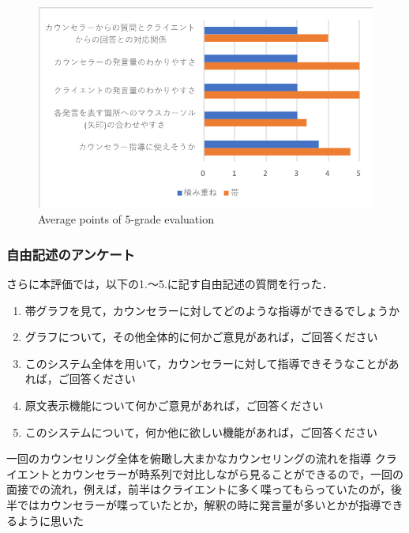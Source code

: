 \documentclass[shuuron]{kuee}
\begin{document}
\begin{figure}
  \begin{center}
    \includegraphics[width=\linewidth]{keijouAnketo.png}
  \end{center}
  \caption{Average points of 5-grade evaluation}
  \label{fig:keijouAnketo}
\end{figure}


\subsubsection{自由記述のアンケート}

さらに本評価では，以下の1.〜5.に記す自由記述の質問を行った．

\begin{enumerate}
  \item 帯グラフを見て，カウンセラーに対してどのような指導ができるでしょうか
  \item グラフについて，その他全体的に何かご意見があれば，ご回答ください
  \item このシステム全体を用いて，カウンセラーに対して指導できそうなことがあれば，ご回答ください
  \item 原文表示機能について何かご意見があれば，ご回答ください
  \item このシステムについて，何か他に欲しい機能があれば，ご回答ください
\end{enumerate}

一回のカウンセリング全体を俯瞰し大まかなカウンセリングの流れを指導
クライエントとカウンセラーが時系列で対比しながら見ることができるので，一回の面接での流れ，例えば，前半はクライエントに多く喋ってもらっていたのが，後半ではカウンセラーが喋っていたとか，解釈の時に発言量が多いとかが指導できるように思いた
\end{document}
